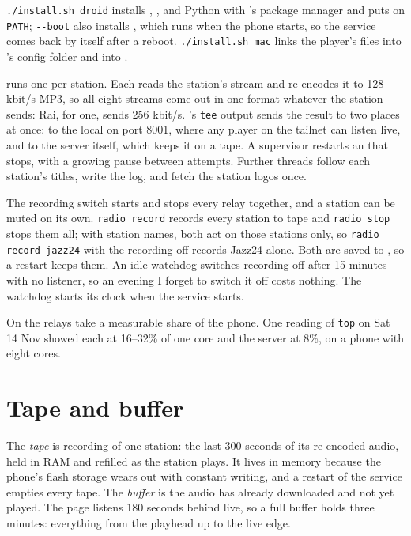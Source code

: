 \documentclass[11pt,a4paper]{article}
\begin{document}
\texttt{./install.sh droid} installs , , and Python with 's package manager and puts  on  \texttt{PATH}; \texttt{-{}-boot} also installs , which  runs when the phone starts, so the service comes back by itself after a reboot. \texttt{./install.sh mac} links the player's files into 's config folder and  into .

 runs one  per station. Each  reads the station's stream and re-encodes it to 128 kbit/s MP3, so all eight streams come out in one format whatever the station sends: Rai, for one, sends 256 kbit/s. 's \texttt{tee} output sends the result to two places at once: to the local  on port 8001, where any player on the tailnet can listen live, and to the server itself, which keeps it on a tape. A supervisor restarts an  that stops, with a growing pause between attempts. Further threads follow each station's titles, write the log, and fetch the station logos once.

The recording switch starts and stops every relay together, and a station can be muted on its own. \texttt{radio record} records every station to tape and \texttt{radio stop} stops them all; with station names, both act on those stations only, so \texttt{radio record jazz24} with the recording off records Jazz24 alone. Both are saved to , so a restart keeps them. An idle watchdog switches recording off after 15 minutes with no listener, so an evening I forget to switch it off costs  nothing. The watchdog starts its clock when the service starts.

On  the relays take a measurable share of the phone. One reading of \texttt{top} on Sat 14 Nov showed each  at 16--32\% of one core and the server at 8\%, on a phone with eight cores.

\section*{Tape and buffer}

The \emph{tape} is  recording of one station: the last 300 seconds of its re-encoded audio, held in RAM and refilled as the station plays. It lives in memory because the phone's flash storage wears out with constant writing, and a restart of the service empties every tape. The \emph{buffer} is the audio  has already downloaded and not yet played. The page listens 180 seconds behind live, so a full buffer holds three minutes: everything from the playhead up to the live edge.
\end{document}
